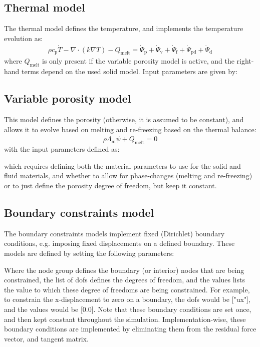 \documentclass[3p]{elsarticle} %
\newcommand{\CodeSnipU}[4]{}
\begin{document}
\subsection{Thermal model}
The thermal model defines the temperature, and implements the temperature evolution as:
\begin{align}
    \rho c_\text{p} \dot{T} - \nabla \cdot (k \nabla T) - Q_\text{melt} = \dot{\Psi}_\text{p} + \dot{\Psi}_\text{v} + \dot{\Psi}_\text{f} + \dot{\Psi}_\text{pd} + \dot{\Psi}_\text{d} \label{eq:Strong_thermal}
\end{align}
where $Q_\text{melt}$ is only present if the variable porosity model is active, and the right-hand terms depend on the used solid model. Input parameters are given by:
\CodeSnipU{TestCases/TriAxialCompression/TriAxial.json}{206}{210}{TestCases/TriAxialCompression/TriAxial.json}


\subsection{Variable porosity model}
This model defines the porosity (otherwise, it is assumed to be constant), and allows it to evolve based on melting and re-freezing based on the thermal balance:
\begin{equation}
    \rho \Lambda_\text{m} \dot{\psi} +  Q_\text{melt} = 0
    \label{eq:Strong_porosity}
\end{equation}
with the input parameters defined as:
\CodeSnipU{TestCases/IceCliffs/IceCliff.json}{227}{234}{TestCases/IceCliffs/IceCliff.json}
which requires defining both the material parameters to use for the solid and fluid materials, and whether to allow for phase-changes (melting and re-freezing) or to just define the porosity degree of freedom, but keep it constant. 

\subsection{Boundary constraints model}
The boundary constraints models implement fixed (Dirichlet) boundary conditions, e.g. imposing fixed displacements on a defined boundary. These models are defined by setting the following parameters:
\CodeSnipU{TestCases/TriAxialCompression/TriAxial.json}{211}{216}{TestCases/TriAxialCompression/TriAxial.json}
Where the node group defines the boundary (or interior) nodes that are being constrained, the list of dofs defines the degrees of freedom, and the values lists the value to which these degree of freedoms are being constrained. For example, to constrain the x-displacement to zero on a boundary, the dofs would be ["ux"], and the values would be [0.0]. Note that these boundary conditions are set once, and then kept constant throughout the simulation. Implementation-wise, these boundary conditions are implemented by eliminating them from the residual force vector, and tangent matrix.
\end{document}
